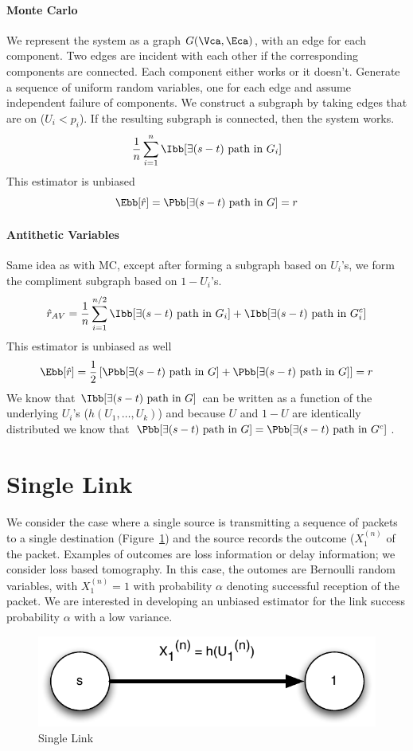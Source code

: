 \documentclass[10pt]{article}
\begin{document}
\paragraph{Monte Carlo}
We represent the system as a graph $G(\Vca,\Eca)$, with an edge for each component. Two edges are incident with each other if the corresponding components are connected. Each component either works or it doesn't. Generate a sequence of uniform random variables, one for each edge and assume independent failure of components. We construct a subgraph by taking edges that are on ($U_i < p_i$). If the resulting subgraph is connected, then the system works.
\[
\frac{1}{n}\displaystyle\sum_{i=1}^{n}\Ibb[\exists (s-t)~\mbox{path in}~G_i]
\]
This estimator is unbiased
\[
\Ebb[\hat{r}]=\Pbb[\exists (s-t)~\mbox{path in}~G]=r
\]

\paragraph{Antithetic Variables}
Same idea as with \ac{MC}, except after forming a subgraph based on $U_i$'s, we form the compliment subgraph based on $1-U_i$'s.
\[
\hat{r}_{AV}=\frac{1}{n}\displaystyle\sum_{i=1}^{n/2}\Ibb[\exists (s-t)~\mbox{path in}~G_i]+\Ibb[\exists (s-t)~\mbox{path in}~G_i^c]
\]
This estimator is unbiased as well
\[
\Ebb[\hat{r}]=\frac{1}{2}\left[\Pbb[\exists (s-t)~\mbox{path in}~G]+\Pbb[\exists (s-t)~\mbox{path in}~G]\right]=r
\]
We know that $\Ibb[\exists (s-t)~\mbox{path in}~G]$ can be written as a function of the underlying $U_i$'s ($h(U_1,\ldots,U_k)$) and because $U$ and $1-U$ are identically distributed we know that $\Pbb[\exists (s-t)~\mbox{path in}~G]=\Pbb[\exists (s-t)~\mbox{path in}~G^c]$.

\section{Single Link}
We consider the case where a single source is transmitting a sequence of packets to a single destination (Figure~\ref{fig:single_link}) and the source records the outcome ($X_{1}^{(n)}$ of the packet. Examples of outcomes are loss information or delay information; we consider loss based tomography. In this case, the outomes are Bernoulli random variables, with $X_{1}^{(n)}=1$ with probability $\alpha$ denoting successful reception of the packet. We are interested in developing an unbiased estimator for the link success probability $\alpha$ with a low variance.

\begin{figure}[ht!]
\centering
\includegraphics[width=0.4\columnwidth]{img/single_link}
\caption{Single Link}\label{fig:single_link}
\end{figure}
\end{document}
